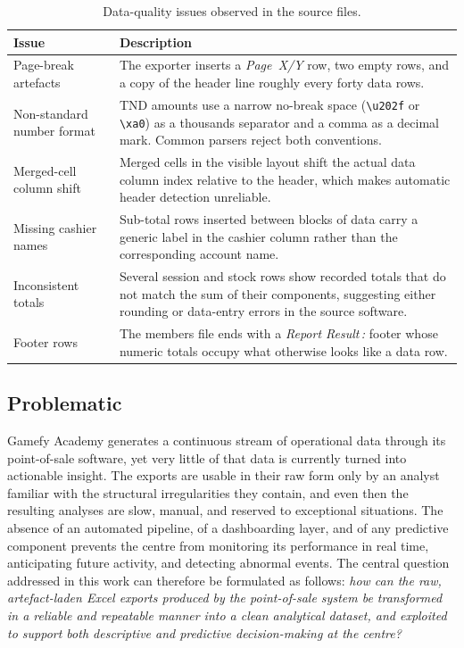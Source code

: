 \documentclass[12pt, a4paper]{report}
\begin{document}
\begin{table}[H]
  \centering
  \caption{Data-quality issues observed in the source files.\label{tab:dq}}
  \begin{tabular}{p{3.5cm} p{9.5cm}}
    \toprule
    \textbf{Issue} & \textbf{Description} \\
    \midrule
    Page-break artefacts
      & The exporter inserts a \textit{Page~X/Y} row, two empty rows, and a
        copy of the header line roughly every forty data rows. \\[4pt]
    Non-standard number format
      & TND amounts use a narrow no-break space
        (\texttt{\textbackslash u202f} or \texttt{\textbackslash xa0}) as a
        thousands separator and a comma as a decimal mark. Common parsers
        reject both conventions. \\[4pt]
    Merged-cell column shift
      & Merged cells in the visible layout shift the actual data column
        index relative to the header, which makes automatic header
        detection unreliable. \\[4pt]
    Missing cashier names
      & Sub-total rows inserted between blocks of data carry a generic
        label in the cashier column rather than the corresponding account
        name. \\[4pt]
    Inconsistent totals
      & Several session and stock rows show recorded totals that do not
        match the sum of their components, suggesting either rounding or
        data-entry errors in the source software. \\[4pt]
    Footer rows
      & The members file ends with a \textit{Report Result\,:} footer
        whose numeric totals occupy what otherwise looks like a data row. \\
    \bottomrule
  \end{tabular}
\end{table}

\subsection{Problematic}

Gamefy Academy generates a continuous stream of operational data through its
point-of-sale software, yet very little of that data is currently turned
into actionable insight. The exports are usable in their raw form only by an
analyst familiar with the structural irregularities they contain, and even
then the resulting analyses are slow, manual, and reserved to exceptional
situations. The absence of an automated pipeline, of a dashboarding layer,
and of any predictive component prevents the centre from monitoring its
performance in real time, anticipating future activity, and detecting
abnormal events. The central question addressed in this work can therefore
be formulated as follows: \textit{how can the raw, artefact-laden Excel
exports produced by the point-of-sale system be transformed in a reliable
and repeatable manner into a clean analytical dataset, and exploited to
support both descriptive and predictive decision-making at the centre?}
\end{document}
